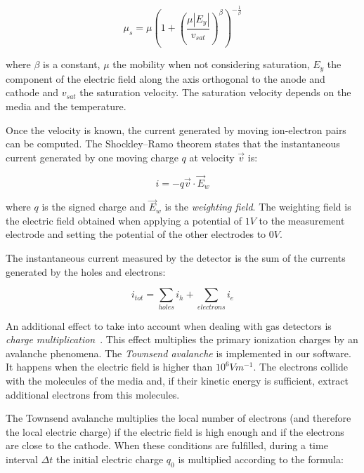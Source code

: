\documentclass[11pt]{article}
\begin{document}
	\begin{equation}
		\mu_s = \mu \left (1 + \left (\frac{\mu |E_y|}{v_{sat}} \right )^{\beta} \right )^{-\frac{1}{\beta}}
		\label{eq:saturation}
	\end{equation}

	where $\beta$ is a constant, $\mu$ the mobility when not considering saturation,
	$E_y$ the component of the electric field along the axis orthogonal to the anode and cathode
	and $v_{sat}$ the saturation velocity. The saturation velocity depends on the
	media and the temperature.

	Once the velocity is known, the current generated by moving ion-electron
	pairs can be computed. The Shockley–Ramo theorem states that the instantaneous current generated
	by one moving charge $q$ at velocity $\vec{v}$ is:

	\begin{equation}
		i = -q \vec{v} \cdot \vec{E}_w
		\label{eq:ramo}
	\end{equation}

	where $q$ is the signed charge and $\vec{E}_w$ is the \textit{weighting field}. The weighting field is the electric field
	obtained when applying a potential of $1V$ to the measurement electrode and setting
	the potential of the other electrodes to $0V$.

	The instantaneous current measured
	by the detector is the sum of the currents generated by the holes and electrons:

	\begin{equation}
		i_{tot} = \sum_{holes} i_h + \sum_{electrons} i_e
		\label{eq:tot_current}
	\end{equation}

	An additional effect to take into account  when dealing with gas detectors is
	\textit{charge multiplication}~\cite{lphy2236}. This effect
	multiplies the primary ionization charges by an avalanche phenomena.
	The \textit{Townsend avalanche} is implemented in our software. It happens
	when the electric field is higher than $10^6Vm^{-1}$. The electrons collide
	with the molecules of the media and, if their kinetic energy is sufficient,
	extract additional electrons from this molecules.

	The Townsend avalanche multiplies the local number of electrons (and therefore the local electric
	charge) if the electric field is high enough and if the electrons are close
	to the cathode. When these conditions are fulfilled, during a time interval
	$\Delta t$ the initial electric charge $q_0$ is multiplied
	according to the formula:
\end{document}
